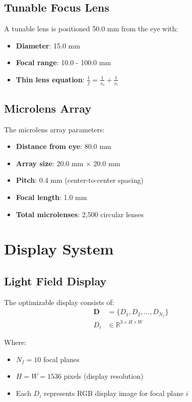 \documentclass[11pt]{article}
\begin{document}
\subsection{Tunable Focus Lens}
A tunable lens is positioned 50.0 mm from the eye with:
\begin{itemize}
    \item \textbf{Diameter}: 15.0 mm
    \item \textbf{Focal range}: 10.0 - 100.0 mm
    \item \textbf{Thin lens equation}: $\frac{1}{f} = \frac{1}{s_o} + \frac{1}{s_i}$
\end{itemize}

\subsection{Microlens Array}
The microlens array parameters:
\begin{itemize}
    \item \textbf{Distance from eye}: 80.0 mm
    \item \textbf{Array size}: 20.0 mm × 20.0 mm
    \item \textbf{Pitch}: 0.4 mm (center-to-center spacing)
    \item \textbf{Focal length}: 1.0 mm
    \item \textbf{Total microlenses}: 2,500 circular lenses
\end{itemize}

\section{Display System}

\subsection{Light Field Display}
The optimizable display consists of:
\begin{align}
\mathbf{D} &= \{D_1, D_2, \ldots, D_{N_f}\} \\
D_i &\in \mathbb{R}^{3 \times H \times W}
\end{align}

Where:
\begin{itemize}
    \item $N_f = 10$ focal planes
    \item $H = W = 1536$ pixels (display resolution)
    \item Each $D_i$ represents RGB display image for focal plane $i$
\end{itemize}
\end{document}
